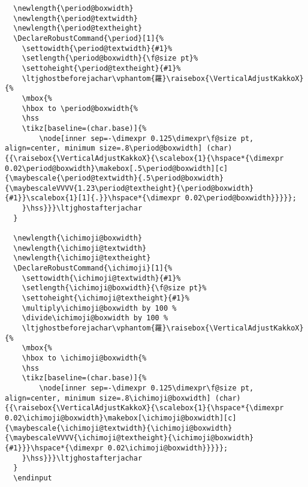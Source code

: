 \documentclass[luatex,fontsize=10pt,paper=b5,twoside]{jlreq}%
\begin{document}
\begin{lstlisting}
  \newlength{\period@boxwidth}
  \newlength{\period@textwidth}
  \newlength{\period@textheight}
  \DeclareRobustCommand{\period}[1]{%
    \settowidth{\period@textwidth}{#1}%
    \setlength{\period@boxwidth}{\f@size pt}%
    \settoheight{\period@textheight}{#1}%
    \ltjghostbeforejachar\vphantom{羅}\raisebox{\VerticalAdjustKakkoX}{%
    \mbox{%
    \hbox to \period@boxwidth{%
    \hss
    \tikz[baseline=(char.base)]{%
        \node[inner sep=-\dimexpr 0.125\dimexpr\f@size pt, align=center, minimum size=.8\period@boxwidth] (char) {{\raisebox{\VerticalAdjustKakkoX}{\scalebox{1}{\hspace*{\dimexpr 0.02\period@boxwidth}\makebox[.5\period@boxwidth][c]{\maybescale{\period@textwidth}{.5\period@boxwidth}{\maybescaleVVVV{1.23\period@textheight}{\period@boxwidth}{#1}}\scalebox{1}[1]{.}}\hspace*{\dimexpr 0.02\period@boxwidth}}}}};
    }\hss}}}\ltjghostafterjachar
  }

  \newlength{\ichimoji@boxwidth}
  \newlength{\ichimoji@textwidth}
  \newlength{\ichimoji@textheight}
  \DeclareRobustCommand{\ichimoji}[1]{%
    \settowidth{\ichimoji@textwidth}{#1}%
    \setlength{\ichimoji@boxwidth}{\f@size pt}%
    \settoheight{\ichimoji@textheight}{#1}%
    \multiply\ichimoji@boxwidth by 100 %
    \divide\ichimoji@boxwidth by 100 %
    \ltjghostbeforejachar\vphantom{羅}\raisebox{\VerticalAdjustKakkoX}{%
    \mbox{%
    \hbox to \ichimoji@boxwidth{%
    \hss
    \tikz[baseline=(char.base)]{%
        \node[inner sep=-\dimexpr 0.125\dimexpr\f@size pt, align=center, minimum size=.8\ichimoji@boxwidth] (char) {{\raisebox{\VerticalAdjustKakkoX}{\scalebox{1}{\hspace*{\dimexpr 0.02\ichimoji@boxwidth}\makebox[\ichimoji@boxwidth][c]{\maybescale{\ichimoji@textwidth}{\ichimoji@boxwidth}{\maybescaleVVVV{\ichimoji@textheight}{\ichimoji@boxwidth}{#1}}}\hspace*{\dimexpr 0.02\ichimoji@boxwidth}}}}};
    }\hss}}}\ltjghostafterjachar
  }
  \endinput
\end{lstlisting}
\end{document}
